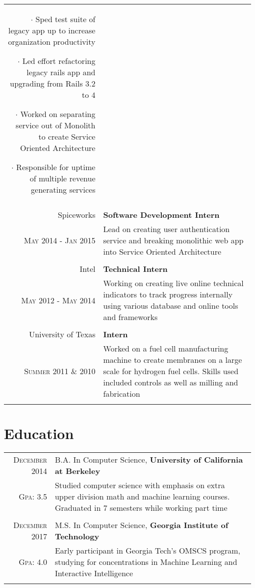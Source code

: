 \documentclass[a4paper,10pt]{article}
\begin{document}
\begin{tabular}{r|p{11cm}}
{		 $\cdot$ Sped test suite of legacy app up to increase organization productivity

		 $\cdot$
		 Led effort refactoring legacy rails app and upgrading from Rails 3.2 to 4

		 $\cdot$
		 Worked on separating service out of Monolith to create Service Oriented Architecture

		 $\cdot$
		 Responsible for uptime of multiple revenue generating services

	 }
	 \\\multicolumn{2}{c}{} \\

 Spiceworks & \textbf{Software Development Intern} \\
 \textsc{May 2014 - Jan 2015} &
	\footnotesize{
		Lead on creating user authentication service and breaking monolithic web app
		into Service Oriented Architecture
	}
	\\\multicolumn{2}{c}{} \\

Intel & \textbf{Technical Intern} \\
\textsc{May 2012 - May 2014} &
 \footnotesize{
	 Working on creating live online technical indicators to track progress
	 internally using various database and online tools and frameworks
 }
 \\\multicolumn{2}{c}{} \\

University of Texas & \textbf{Intern} \\
\textsc{Summer 2011 \& 2010} &
\footnotesize{
	Worked on a fuel cell manufacturing machine to create membranes on a large
	scale for hydrogen fuel cells. Skills used included controls as well as
	milling and fabrication
}
\\\multicolumn{2}{c}{} \\

\end{tabular}

\section{Education}
\begin{tabular}{rp{11cm}}
 \textsc{December} 2014 & B.A. In Computer Science, \textbf{University of California at Berkeley}\\
 \textsc{Gpa}: 3.5 &
 \footnotesize{
	 Studied computer science with emphasis on extra upper
	 division math and machine learning courses.
	 Graduated in 7 semesters while working part time
}
	 \\\multicolumn{2}{c}{} \\

	\textsc{December} 2017 & M.S. In Computer Science, \textbf{Georgia Institute of Technology}\\
	\textsc{Gpa}: 4.0 &
	\footnotesize{
Early participant in Georgia Tech's OMSCS program, studying for concentrations
in Machine Learning and Interactive Intelligence
 }
		\\\multicolumn{2}{c}{} \\

\end{tabular}


\end{document}
